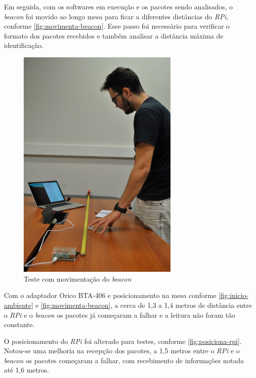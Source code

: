 Em seguida, com os softwares em execução e os pacotes sendo analisados, o \textit{beacon} foi movido ao longo mesa para ficar a diferentes distâncias do \textit{RPi}, conforme \autoref{fig:movimenta-beacon}. Esse passo foi necessário para verificar o formato dos pacotes recebidos e também analisar a distância máxima de identificação.

\begin{figure}[htb]
	\caption{\label{fig:movimenta-beacon}Teste com movimentação do \textit{beacon}}
	\begin{center}
		\includegraphics[width=0.7\textwidth]{img/ambiente4.jpg}
	\end{center}
\end{figure}

Com o adaptador Orico BTA-406 e posicionamento na mesa conforme \autoref{fig:inicio-ambiente} e \autoref{fig:movimenta-beacon}, a cerca de 1,3 a 1,4 metros de distância entre o \textit{RPi} e o \textit{beacon} os pacotes já começaram a falhar e a leitura não foram tão constante.

O posicionamento do \textit{RPi} foi alterado para testes, conforme \autoref{fig:posiciona-rpi}. Notou-se uma melhoria na recepção dos pacotes, a 1,5 metros entre o \textit{RPi} e o \textit{beacon} os pacotes começaram a falhar, com recebimento de informações notada até 1,6 metros.

